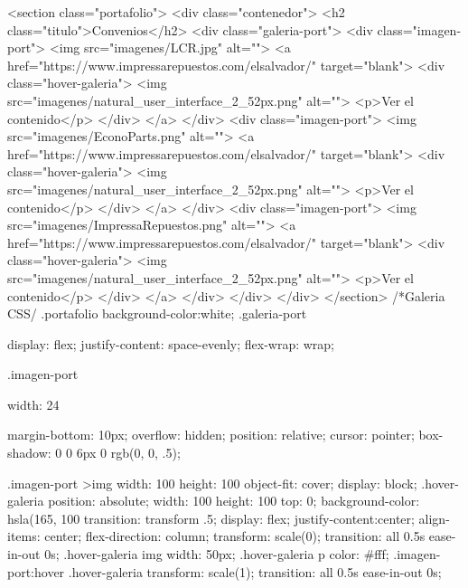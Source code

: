  <section class="portafolio">
      <div class="contenedor">
        <h2 class="titulo">Convenios</h2>
        <div class="galeria-port">
          <div class="imagen-port">
            <img src="imagenes/LCR.jpg" alt="">
            <a href="https://www.impressarepuestos.com/elsalvador/" target="blank">
            <div class="hover-galeria">      
              <img src="imagenes/natural_user_interface_2_52px.png" alt="">
              <p>Ver el contenido</p>
            </div>
            </a>
          </div>
          <div class="imagen-port">
            <img src="imagenes/EconoParts.png" alt="">
          <a href="https://www.impressarepuestos.com/elsalvador/" target="blank">
            <div class="hover-galeria">
              <img src="imagenes/natural_user_interface_2_52px.png" alt="">
              <p>Ver el contenido</p>
            </div>
          </a>
          </div> 
          <div class="imagen-port">
            <img src="imagenes/ImpressaRepuestos.png" alt="">
            <a href="https://www.impressarepuestos.com/elsalvador/" target="blank">
            <div class="hover-galeria">
              <img src="imagenes/natural_user_interface_2_52px.png" alt="">
              <p>Ver el contenido</p>
            </div>
          </a>
          </div> 
        </div>
      </div>
    </section>
    /*Galeria CSS/
    .portafolio{
      background-color:white;
    }
    .galeria-port{
        display: flex;
        justify-content: space-evenly;
        flex-wrap: wrap;
      
    }
    .imagen-port{
        width: 24%
      
        margin-bottom: 10px;
        overflow: hidden;
        position: relative;
        cursor: pointer;
        box-shadow:  0 0 6px 0 rgb(0, 0, .5);
    }
    .imagen-port >img{
        width: 100%
        height: 100%
        object-fit: cover;
        display: block;
    }
    .hover-galeria{
        position: absolute;
        width: 100%
        height: 100%
        top: 0;
        background-color: hsla(165, 100%
        transition: transform .5;
        display: flex;
        justify-content:center;
        align-items: center;
        flex-direction: column;
        transform: scale(0);
        transition: all 0.5s ease-in-out 0s;
    }
    .hover-galeria img{
        width: 50px;
    }
    .hover-galeria p{
        color: #fff;
    }
    .imagen-port:hover .hover-galeria{
        transform: scale(1);
        transition: all 0.5s ease-in-out 0s;
    }
    
